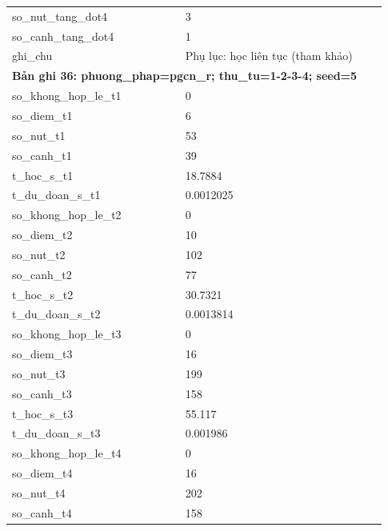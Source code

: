 \begin{longtable}{p{0.43\linewidth}p{0.50\linewidth}}
so\_\allowbreak nut\_\allowbreak tang\_\allowbreak dot4 & 3 \\
so\_\allowbreak canh\_\allowbreak tang\_\allowbreak dot4 & 1 \\
ghi\_\allowbreak chu & Phụ lục: học liên tục (tham khảo) \\
\midrule
\multicolumn{2}{p{0.95\linewidth}}{\textbf{Bản ghi 36: phuong\_phap=pgcn\_r; thu\_tu=1-2-3-4; seed=5}} \\
so\_\allowbreak khong\_\allowbreak hop\_\allowbreak le\_\allowbreak t1 & 0 \\
so\_\allowbreak diem\_\allowbreak t1 & 6 \\
so\_\allowbreak nut\_\allowbreak t1 & 53 \\
so\_\allowbreak canh\_\allowbreak t1 & 39 \\
t\_\allowbreak hoc\_\allowbreak s\_\allowbreak t1 & 18.7884 \\
t\_\allowbreak du\_\allowbreak doan\_\allowbreak s\_\allowbreak t1 & 0.0012025 \\
so\_\allowbreak khong\_\allowbreak hop\_\allowbreak le\_\allowbreak t2 & 0 \\
so\_\allowbreak diem\_\allowbreak t2 & 10 \\
so\_\allowbreak nut\_\allowbreak t2 & 102 \\
so\_\allowbreak canh\_\allowbreak t2 & 77 \\
t\_\allowbreak hoc\_\allowbreak s\_\allowbreak t2 & 30.7321 \\
t\_\allowbreak du\_\allowbreak doan\_\allowbreak s\_\allowbreak t2 & 0.0013814 \\
so\_\allowbreak khong\_\allowbreak hop\_\allowbreak le\_\allowbreak t3 & 0 \\
so\_\allowbreak diem\_\allowbreak t3 & 16 \\
so\_\allowbreak nut\_\allowbreak t3 & 199 \\
so\_\allowbreak canh\_\allowbreak t3 & 158 \\
t\_\allowbreak hoc\_\allowbreak s\_\allowbreak t3 & 55.117 \\
t\_\allowbreak du\_\allowbreak doan\_\allowbreak s\_\allowbreak t3 & 0.001986 \\
so\_\allowbreak khong\_\allowbreak hop\_\allowbreak le\_\allowbreak t4 & 0 \\
so\_\allowbreak diem\_\allowbreak t4 & 16 \\
so\_\allowbreak nut\_\allowbreak t4 & 202 \\
so\_\allowbreak canh\_\allowbreak t4 & 158 \\

\end{longtable}
